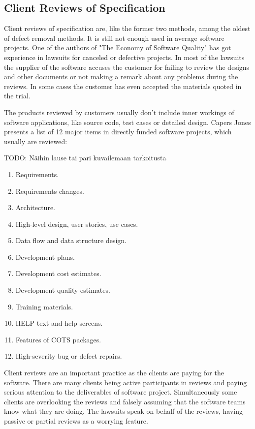 \subsection{Client Reviews of Specification} 
\label{subsec:clientreview}

Client reviews of specification are, like the former two methods, among the oldest of defect removal methods. It is still not enough used in average software projects. One of the authors of "The Economy of Software Quality" has got experience in lawsuits for canceled or defective projects. In most of the lawsuits the supplier of the software accuses the customer for failing to review the designs and other documents or not making a remark about any problems during the reviews. In some cases the customer has even accepted the materials quoted in the trial.

The products reviewed by customers usually don't include inner workings of software applications, like source code, test cases or detailed design. Capers Jones presents a list of 12 major items in directly funded software projects, which usually are reviewed:

TODO: Näihin lause tai pari kuvailemaan tarkoitusta

\begin{enumerate}
	\item Requirements.
	\item Requirements changes.
	\item Architecture.
	\item High-level design, user stories, use cases.
	\item Data flow and data structure design.
	\item Development plans.
	\item Development cost estimates.
	\item Development quality estimates.
	\item Training materials.
	\item HELP text and help screens.
	\item Features of COTS packages.
	\item High-severity bug or defect repairs.
\end{enumerate}

Client reviews are an important practice as the clients are paying for the software. There are many clients being active participants in reviews and paying serious attention to the deliverables of software project. Simultaneously some clients are overlooking the reviews and falsely assuming that the software teams know what they are doing. The lawsuits speak on behalf of the reviews, having passive or partial reviews as a worrying feature.

